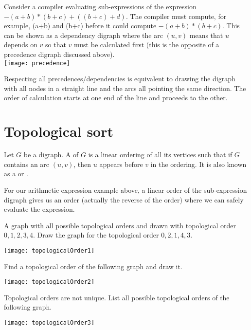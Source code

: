 \begin{Boxample}[0]
Consider a compiler evaluating sub-expressions of the expression $-(a+b) * (b+c) + ((b+c)+d)$.  
The compiler must compute, for example, (a+b) and (b+c) before it could compute $-(a+b) * (b+c)$. 
This can be shown as a dependency digraph where the arc $(u,v)$ means 
that $u$ depends on $v$ so that $v$ must be calculated first (this is the opposite of a precedence digraph discussed above).\\
\texttt{[image: precedence]}
\end{Boxample}

Respecting all precedences/dependencies is equivalent to drawing the digraph 
with all nodes in a straight line and the arcs all pointing the same direction. 
The order of calculation starts at one end of the line and proceeds to the other.

\section{Topological sort}
\begin{Definition}
Let $G$ be a digraph. A  of $G$ is a linear
ordering of all its vertices such that if $G$ contains an arc $(u,v)$,
then $u$ appears before $v$ in the ordering. 
It is also known as a  or .
\end{Definition}

For our arithmetic expression example above, a linear
order of the sub-expression digraph gives us an order (actually the reverse
of the order) where we can safely evaluate the expression.

\begin{Boxample}[0]
\label{ex:topoorders}
A graph with all possible topological orders and drawn with topological order $0, 1, 2, 3, 4$.  
Draw the graph for the topological order $0, 2, 1, 4, 3$. 
\begin{center}
\texttt{[image: topologicalOrder1]}
\end{center}
Find a topological order of the following graph and draw it.
\begin{center}
\texttt{[image: topologicalOrder2]}
\end{center}
Topological orders are not unique. List all possible topological orders of the following graph.
\begin{center}
\texttt{[image: topologicalOrder3]}
\end{center}
\end{Boxample}


